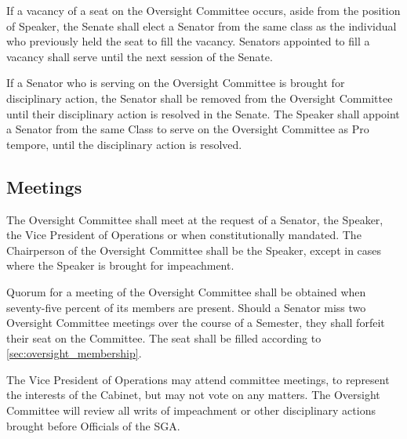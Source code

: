 \documentclass[12pt]{scrreprt}
\begin{document}
If a vacancy of a seat on the Oversight Committee occurs, aside from the position of Speaker, the Senate shall elect a Senator from the same class as the individual who previously held the seat to fill the vacancy. Senators appointed to fill a vacancy shall serve until the next session of the Senate. 

If a Senator who is serving on the Oversight Committee is brought for 
disciplinary action, the Senator shall be removed from the Oversight Committee 
until their disciplinary action is resolved in the Senate. The Speaker shall 
appoint a Senator from the same Class to serve on the Oversight Committee as 
Pro tempore, until the disciplinary action is resolved. 

\subsection{Meetings}
The Oversight Committee shall meet at the request of a Senator, the Speaker, 
the Vice President of Operations or when constitutionally mandated. The Chairperson of the 
Oversight Committee shall be the Speaker, except in cases where the Speaker is 
brought for impeachment. 

Quorum for a meeting of the Oversight Committee shall be obtained when 
seventy-five percent of its members are present. Should a Senator miss two 
Oversight Committee meetings over the course of a Semester, they shall forfeit 
their seat on the Committee. The seat shall be filled according to 
\ref{sec:oversight_membership}. 

The Vice President of Operations may attend committee meetings, to represent the interests 
of the Cabinet, but may not vote on any matters. The Oversight Committee will 
review all writs of impeachment or other disciplinary actions brought before 
Officials of the SGA. 
\end{document}

